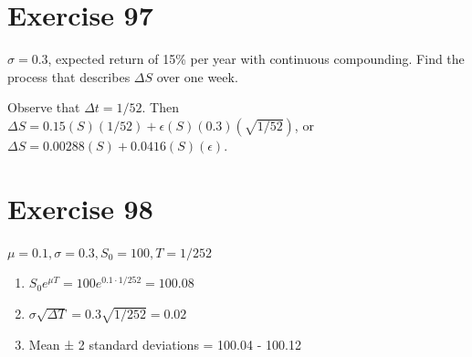 \documentclass{article}
\begin{document}
\section*{Exercise 97}
$\sigma = 0.3$, expected return of 15\% per year with continuous compounding. Find the process that describes $\Delta S$ over one week.
\begin{flushleft}
    Observe that $\Delta t = 1/52$. Then $\Delta S = 0.15(S)(1/52) + \epsilon(S)(0.3)(\sqrt{1/52})$, or $\Delta S = 0.00288(S) + 0.0416(S)(\epsilon)$.
\end{flushleft}

\section*{Exercise 98}
$\mu = 0.1, \sigma = 0.3, S_0 = 100, T = 1/252$
\begin{flushleft}
    \begin{enumerate}
        \item $S_0e^{\mu T} = 100e^{0.1 \cdot 1/252} = 100.08$
        \item $\sigma \sqrt{\Delta T} = 0.3 \sqrt{1/252} = 0.02$
        \item Mean ± 2 standard deviations = 100.04 - 100.12
    \end{enumerate}
\end{flushleft}
\end{document}
